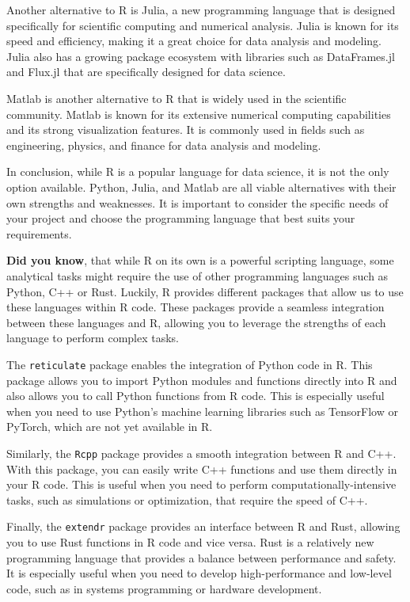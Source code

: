 \documentclass[
]{book}
\begin{document}
Another alternative to R is Julia, a new programming language that is designed specifically for scientific computing and numerical analysis. Julia is known for its speed and efficiency, making it a great choice for data analysis and modeling. Julia also has a growing package ecosystem with libraries such as DataFrames.jl and Flux.jl that are specifically designed for data science.

Matlab is another alternative to R that is widely used in the scientific community. Matlab is known for its extensive numerical computing capabilities and its strong visualization features. It is commonly used in fields such as engineering, physics, and finance for data analysis and modeling.

In conclusion, while R is a popular language for data science, it is not the only option available. Python, Julia, and Matlab are all viable alternatives with their own strengths and weaknesses. It is important to consider the specific needs of your project and choose the programming language that best suits your requirements.

\textbf{Did you know}, that while R on its own is a powerful scripting language, some analytical tasks might require the use of other programming languages such as Python, C++ or Rust. Luckily, R provides different packages that allow us to use these languages within R code. These packages provide a seamless integration between these languages and R, allowing you to leverage the strengths of each language to perform complex tasks.

The \texttt{reticulate} package enables the integration of Python code in R. This package allows you to import Python modules and functions directly into R and also allows you to call Python functions from R code. This is especially useful when you need to use Python's machine learning libraries such as TensorFlow or PyTorch, which are not yet available in R.

Similarly, the \texttt{Rcpp} package provides a smooth integration between R and C++. With this package, you can easily write C++ functions and use them directly in your R code. This is useful when you need to perform computationally-intensive tasks, such as simulations or optimization, that require the speed of C++.

Finally, the \texttt{extendr} package provides an interface between R and Rust, allowing you to use Rust functions in R code and vice versa. Rust is a relatively new programming language that provides a balance between performance and safety. It is especially useful when you need to develop high-performance and low-level code, such as in systems programming or hardware development.
\end{document}
